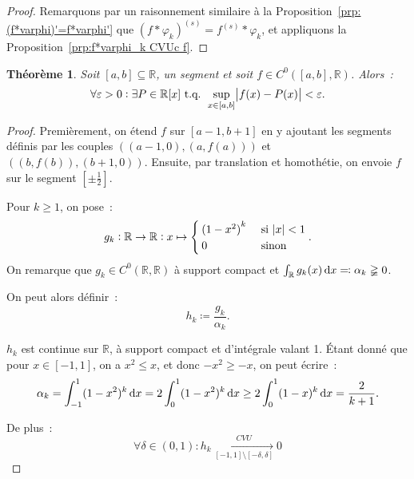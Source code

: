 \documentclass{report}
\newtheorem{thm}{Théorème}[chapter]
\theoremstyle{definition}
\theoremstyle{remark}
\numberwithin{equation}{section}
\newcommand{\R}{\mathbb R}
\newcommand{\tq}{\text{ t.q. }}
\begin{document}
			\begin{proof} Remarquons par un raisonnement similaire à la Proposition~\ref{prp:(f*varphi)'=f*varphi'} que $(f*\varphi_k)^{(s)} = f^{(s)}*\varphi_k$, et
			appliquons la Proposition~\ref{prp:f*varphi_k CVUc f}.
			\end{proof}

			\begin{thm} Soit $[a, b] \subseteq \R$, un segment et soit $f \in C^0([a, b], \R)$. Alors~:
			\begin{equation}
				\forall \varepsilon > 0 : \exists P \in \R[x] \tq \sup_{x \in [a, b]}\abs {f(x)-P(x)} < \varepsilon.
			\end{equation}
			\end{thm}

			\begin{proof} Premièrement, on étend $f$ sur $[a-1, b+1]$ en y ajoutant les segments définis par les couples $\left((a-1, 0), (a, f(a))\right)$ et
			$\left((b, f(b)), (b+1, 0)\right)$. Ensuite, par translation et homothétie, on envoie $f$ sur le segment $\left[\pm \frac 12\right]$.

			Pour $k \geq 1$, on pose~:
			\begin{equation}
				g_k : \R \to \R : x \mapsto \begin{cases}{(1-x^2)}^k &\text{ si } \abs x < 1 \\0 &\text{ sinon}\end{cases}.
			\end{equation}
			On remarque que $g_k \in C^0(\R, \R)$ à support compact et $\int_\R g_k(x)\dif x \eqqcolon \alpha_k \gneqq 0$.

			On peut alors définir~:
			\begin{equation}
				h_k \coloneqq \frac {g_k}{\alpha_k}.
			\end{equation}

			$h_k$ est continue sur $\R$, à support compact et d'intégrale valant 1. Étant donné que pour $x \in [-1, 1]$, on a $x^2 \leq x$, et donc $-x^2 \geq -x$,
			on peut écrire~:
			\begin{equation}
				\alpha_k = \int_{-1}^1(1-x^2)^k\dif x = 2\int_0^1(1-x^2)^k\dif x \geq 2\int_0^1(1-x)^k\dif x = \frac 2{k+1}.
			\end{equation}

			De plus~:
			\begin{equation}
				\forall \delta \in (0, 1) : h_k \xrightarrow[{[-1, 1] \setminus [-\delta, \delta]}]{CVU} 0
			\end{equation}


\end{proof}
\end{document}
